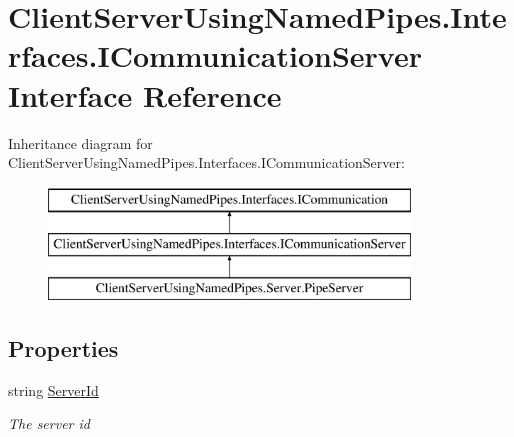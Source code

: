\hypertarget{interface_client_server_using_named_pipes_1_1_interfaces_1_1_i_communication_server}{}\section{Client\+Server\+Using\+Named\+Pipes.\+Interfaces.\+I\+Communication\+Server Interface Reference}
\label{interface_client_server_using_named_pipes_1_1_interfaces_1_1_i_communication_server}
Inheritance diagram for Client\+Server\+Using\+Named\+Pipes.\+Interfaces.\+I\+Communication\+Server\+:\begin{figure}[H]
\begin{center}
\leavevmode
\includegraphics[height=3.000000cm]{interface_client_server_using_named_pipes_1_1_interfaces_1_1_i_communication_server}
\end{center}
\end{figure}
\subsection*{Properties}
\begin{DoxyCompactItemize}
\item 
string \hyperlink{interface_client_server_using_named_pipes_1_1_interfaces_1_1_i_communication_server_a228f8ff6706a75110542feb9790d68e1}{Server\+Id}
\begin{DoxyCompactList}\small\item\em The server id \end{DoxyCompactList}\end{DoxyCompactItemize}
